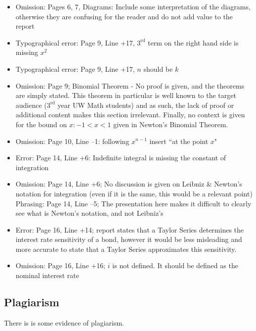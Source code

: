 \documentclass[11pt]{article}
\begin{document}
\begin{itemize}
\item Omission: Pages 6, 7, Diagrams: Include some interpretation of the diagrams, otherwise they are confusing for the reader and do not add value to the report
\item Typographical error: Page 9, Line +17, $3^{\text{rd}}$ term on the right hand side is missing $x^2$
\item Typographical error: Page 9, Line +17, $n$ should be $k$
\item Omission: Page 9; Binomial Theorem - No proof is given, and the theorems are simply stated. This theorem in particular is well known to the target audience ($3^{\text{rd}}$ year UW Math students) and as such, the lack of proof or additional content makes this section irrelevant. Finally, no context is given for the bound on $x: -1 < x < 1$ given in Newton's Binomial Theorem.
\item Omission: Page 10, Line --1: following $x^{n-1}$ insert ``at the point $x$"
\item Error: Page 14, Line +6: Indefinite integral is missing the constant of integration
\item Omission: Page 14, Line +6; No discussion is given on Leibniz \& Newton's notation for integration (even if it is the same, this would be a relevant point)
Phrasing: Page 14, Line --5; The presentation here makes it difficult to clearly see what is Newton's notation, and not Leibniz's 
\item Error: Page 16, Line +14; report states that a Taylor Series determines the interest rate sensitivity of a bond, however it would be less misleading and more accurate to state that a Taylor Series approximates this sensitivity.
\item Omission: Page 16, Line +16; $i$ is not defined. It should be defined as the nominal interest rate
\end{itemize}

\subsection*{Plagiarism}

There is is some evidence of plagiarism.
\end{document}
